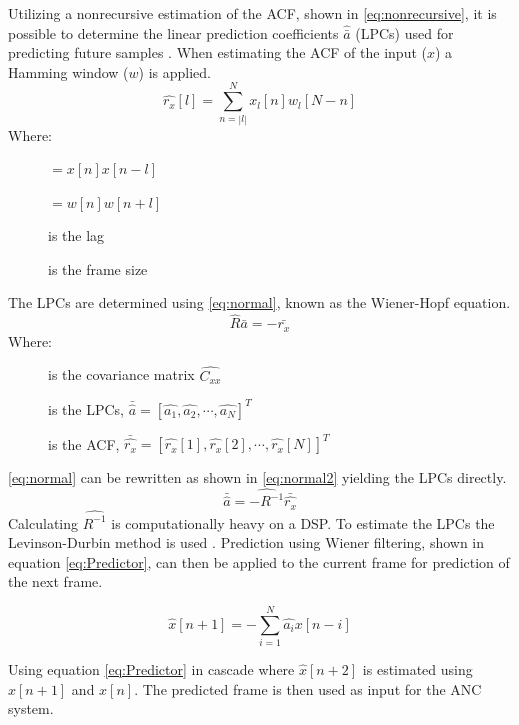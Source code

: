 Utilizing a nonrecursive estimation of the ACF, shown in \autoref{eq:nonrecursive}, it is possible to determine the linear prediction coefficients $\hat{\bar{a}}$ (LPCs) used for predicting future samples \cite{LinearPrediction}. When estimating the ACF of the input ($x$) a Hamming window ($w$) is applied.
\begin{equation}\label{eq:nonrecursive}
\hat{r_x}[l] = \sum^{N}_{n=\left| l\right|} x_l[n]w_l[N-n]
\end{equation}
Where:
\vspace{-8mm}
\begin{description}
	\item[] $=x[n]x[n-l]$ 
	\item[] $=w[n]w[n+l]$
	\item[] is the lag 
	\item[] is the frame size
\end{description}
The LPCs are determined using \autoref{eq:normal}, known as the Wiener-Hopf equation.
\begin{equation}\label{eq:normal}
\hat{R}  \bar{a} = -\bar{r_x}
\end{equation}
Where:
\vspace{-8mm} %
\begin{description}
	\item[] is the covariance matrix $\hat{C_{xx}}$
	\item[] is the LPCs, $\bar{\hat{a}} = [\hat{a_1} , \hat{a_2}, \cdots, \hat{a_N}]^T$
	\item[] is the ACF, $\bar{\hat{r_x}} = [\hat{r_x}[1] , \hat{r_x}[2], \cdots, \hat{r_x}[N]]^T$
\end{description}
\autoref{eq:normal} can be rewritten as shown in \autoref{eq:normal2} yielding the LPCs directly.  
 \begin{equation}\label{eq:normal2}
\bar{\hat{a}} = \hat{-R^{-1}} \bar{\hat{r_x}}
\end{equation}
Calculating $\hat{R^{-1}}$ is computationally heavy on a DSP. To estimate the LPCs the Levinson-Durbin method is used \cite{LinearPrediction}. Prediction using Wiener filtering, shown in equation \ref{eq:Predictor}, can then be applied to the current frame for prediction of the next frame. 

\begin{equation}\label{eq:Predictor}
\hat{x}[n+1] =- \sum^{N}_{i=1}\hat{a_i}x[n-i]
\end{equation}

Using equation \ref{eq:Predictor} in cascade where $\hat{x}[n+2]$ is estimated using $\hat{x}[n+1]$ and $x[n]$. The predicted frame is then used as input for the ANC system.

